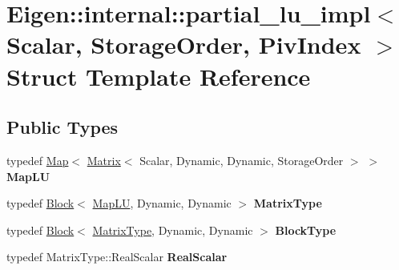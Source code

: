\hypertarget{struct_eigen_1_1internal_1_1partial__lu__impl}{}\section{Eigen\+::internal\+::partial\+\_\+lu\+\_\+impl$<$ Scalar, Storage\+Order, Piv\+Index $>$ Struct Template Reference}
\label{struct_eigen_1_1internal_1_1partial__lu__impl}
\subsection*{Public Types}
\begin{DoxyCompactItemize}
\item 
\mbox{\label{struct_eigen_1_1internal_1_1partial__lu__impl_ac7d76f45eeb96ba883c796772dc74191}} 
typedef \mbox{\hyperlink{class_eigen_1_1_map}{Map}}$<$ \mbox{\hyperlink{class_eigen_1_1_matrix}{Matrix}}$<$ Scalar, Dynamic, Dynamic, Storage\+Order $>$ $>$ {\bfseries Map\+LU}
\item 
\mbox{\label{struct_eigen_1_1internal_1_1partial__lu__impl_aef9745ce92a2b897556eca8b407aaf57}} 
typedef \mbox{\hyperlink{class_eigen_1_1_block}{Block}}$<$ \mbox{\hyperlink{class_eigen_1_1_map}{Map\+LU}}, Dynamic, Dynamic $>$ {\bfseries Matrix\+Type}
\item 
\mbox{\label{struct_eigen_1_1internal_1_1partial__lu__impl_ad63bb1112bcc2ea7fe95267d79c5f0af}} 
typedef \mbox{\hyperlink{class_eigen_1_1_block}{Block}}$<$ \mbox{\hyperlink{class_eigen_1_1_block}{Matrix\+Type}}, Dynamic, Dynamic $>$ {\bfseries Block\+Type}
\item 
\mbox{\label{struct_eigen_1_1internal_1_1partial__lu__impl_a66b78c8f3358a04ed1a11be0d4e65c69}} 
typedef Matrix\+Type\+::\+Real\+Scalar {\bfseries Real\+Scalar}
\end{DoxyCompactItemize}
